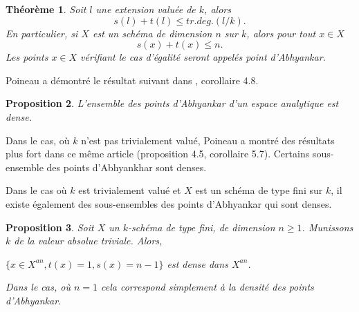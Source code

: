 \documentclass[11pt]{article}
\newtheorem{thm}{Théorème}[section]
\newtheorem{prop}[thm]{Proposition}
\begin{document}
\begin{thm}
Soit $l$ une extension valuée de $k$, alors 
\begin{equation*}
s(l) + t(l) \leq tr.deg.(l/k).
\end{equation*}
En particulier, si $X$ est un schéma de dimension $n$ sur $k$, alors pour tout $x\in X$
\begin{equation*}
s(x) + t(x) \leq n.
\end{equation*}
Les points $x\in X$ vérifiant le cas d'égalité seront appelés point d'Abhyankar.
\end{thm}

Poineau a démontré le résultat suivant dans \cite{PoineauAngelique}, corollaire 4.8.
\begin{prop}
L'ensemble des points d'Abhyankar d'un espace analytique est dense.
\end{prop}

Dans le cas, où $k$ n'est pas trivialement valué, Poineau a montré des résultats plus fort dans ce même article (proposition 4.5, corollaire 5.7). Certains sous-ensemble des points d'Abhyankhar sont denses. 

Dans le cas où $k$ est trivialement valué et $X$ est un schéma de type fini sur $k$, il existe également des sous-ensembles des points d'Abhyankar qui sont denses.

\begin{prop}\label{points de type 2 sur type 3 sont denses}
Soit $X$ un $k$-schéma de type fini, de dimension $n \geq 1$. Munissons $k$ de la valeur absolue triviale. Alors,
\begin{center}
$\lbrace x \in X^{an}, t(x) = 1, s(x) = n-1\rbrace$ est dense dans $X^{an}$.
\end{center} 
Dans le cas, où $n=1$ cela correspond simplement à la densité des points d'Abhyankar.
\end{prop}
\end{document}

